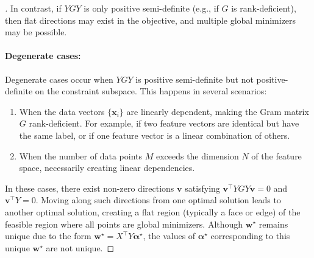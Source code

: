 \begin{proof}[]{}

	In contrast, if $YGY$ is only positive semi-definite (e.g., if $G$ is rank-deficient), then flat directions may exist in the objective, and multiple global minimizers may be possible.
	\paragraph{Degenerate cases:} Degenerate cases occur when $YGY$ is positive semi-definite but not positive-definite on the constraint subspace. This happens in several scenarios:
	\begin{enumerate}
		\item When the data vectors $\{\symbf{x}_i\}$ are linearly dependent, making the Gram matrix $G$ rank-deficient. For example, if two feature vectors are identical but have the same label, or if one feature vector is a linear combination of others.
		\item When the number of data points $M$ exceeds the dimension $N$ of the feature space, necessarily creating linear dependencies.
	\end{enumerate}
	In these cases, there exist non-zero directions $\symbf{v}$ satisfying $\symbf{v}^\top YGY \symbf{v} = 0$ and $\symbf{v}^\top Y = 0$. Moving along such directions from one optimal solution leads to another optimal solution, creating a flat region (typically a face or edge) of the feasible region where all points are global minimizers.
	Although $\symbf{w}^\star$ remains unique due to the form $\symbf{w}^\star = X^\top Y \symbf{\alpha}^\star$, the values of $\symbf{\alpha}^\star$ corresponding to this unique $\symbf{w}^\star$ are not unique.
\end{proof}
